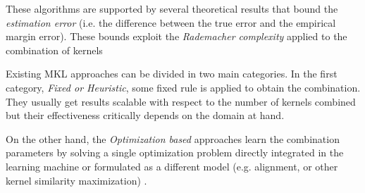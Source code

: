 \documentclass{esannV2}
\newcommand{\1}{{\bf 1}}
\begin{document}
These algorithms are supported by several theoretical results that bound the \emph{estimation error} (i.e. the difference between the true error and the empirical margin error). These bounds exploit the \emph{Rademacher complexity} applied to the combination of kernels \cite{Maurer2012,Cortes2009c}%

Existing MKL approaches can be divided in two main categories. In the first category, \emph{Fixed or Heuristic}, some fixed rule is applied to obtain the combination. They usually get results scalable with respect to the number of kernels combined but their effectiveness critically depends on the domain at hand. %

On the other hand, the \emph{Optimization based} approaches learn the combination parameters by solving a single optimization problem directly integrated in the learning machine %
or formulated as a different model (e.g. alignment, or other kernel similarity maximization) \cite{Rakotomamonjy2008,Varma2009}. %

\end{document}

